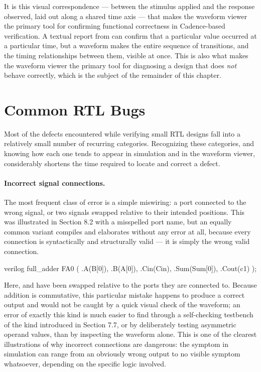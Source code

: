 It is this visual correspondence --- between the stimulus applied and the response observed, laid out along a shared time axis --- that makes the waveform viewer the primary tool for confirming functional correctness in Cadence-based verification. A textual report from  can confirm that a particular value occurred at a particular time, but a waveform makes the entire sequence of transitions, and the timing relationships between them, visible at once. This is also what makes the waveform viewer the primary tool for diagnosing a design that does \emph{not} behave correctly, which is the subject of the remainder of this chapter.

\section{Common RTL Bugs}

Most of the defects encountered while verifying small RTL designs fall into a relatively small number of recurring categories. Recognizing these categories, and knowing how each one tends to appear in simulation and in the waveform viewer, considerably shortens the time required to locate and correct a defect.\\

\paragraph{Incorrect signal connections.} The most frequent class of error is a simple miswiring: a port connected to the wrong signal, or two signals swapped relative to their intended positions. This was illustrated in Section 8.2 with a misspelled port name, but an equally common variant compiles and elaborates without any error at all, because every connection is syntactically and structurally valid --- it is simply the wrong valid connection.\\

\begin{codeblock}{verilog}
full_adder FA0 (
    .A(B[0]),
    .B(A[0]),
    .Cin(Cin),
    .Sum(Sum[0]),
    .Cout(c1)
);
\end{codeblock}

Here,  and  have been swapped relative to the ports they are connected to. Because addition is commutative, this particular mistake happens to produce a correct  output and would not be caught by a quick visual check of the waveform; an error of exactly this kind is much easier to find through a self-checking testbench of the kind introduced in Section 7.7, or by deliberately testing asymmetric operand values, than by inspecting the waveform alone. This is one of the clearest illustrations of why incorrect connections are dangerous: the symptom in simulation can range from an obviously wrong output to no visible symptom whatsoever, depending on the specific logic involved.\\

